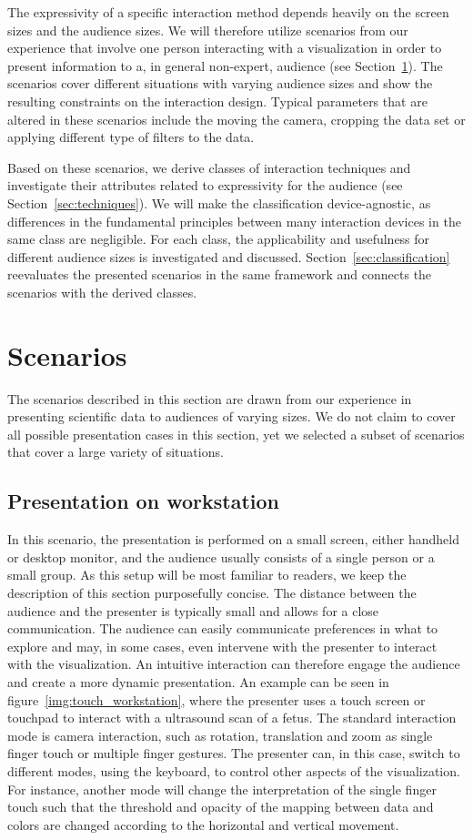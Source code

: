 \documentclass[review,journal]{vgtc}         %
\begin{document}
The expressivity of a specific interaction method depends heavily on the screen sizes and the audience sizes.
We will therefore utilize scenarios from our experience that involve one person interacting with a visualization in order to present information to a, in general non-expert, audience (see Section~\ref{sec:scenario}).
The scenarios cover different situations with varying audience sizes and show the resulting constraints on the interaction design.
Typical parameters that are altered in these scenarios include the moving the camera, cropping the data set or applying different type of filters to the data.

Based on these scenarios, we derive classes of interaction techniques and investigate their attributes related to expressivity for the audience (see Section~\ref{sec:techniques}).
We will make the classification device-agnostic, as differences in the fundamental principles between many interaction devices in the same class are negligible.
For each class, the applicability and usefulness for different audience sizes is investigated and discussed.
Section~\ref{sec:classification} reevaluates the presented scenarios in the same framework and connects the scenarios with the derived classes.

%
%
%
\section{Scenarios} \label{sec:scenario}
The scenarios described in this section are drawn from our experience in presenting scientific data to audiences of varying sizes.
We do not claim to cover all possible presentation cases in this section, yet we selected a subset of scenarios that cover a large variety of situations.

%
%
\subsection{Presentation on workstation}
In this scenario, the presentation is performed on a small screen, either handheld or desktop monitor, and the audience usually consists of a single person or a small group.
As this setup will be most familiar to readers, we keep the description of this section purposefully concise.
The distance between the audience and the presenter is typically small and allows for a close communication.
The audience can easily communicate preferences in what to explore and may, in some cases, even intervene with the presenter to interact with the visualization.
An intuitive interaction can therefore engage the audience and create a more dynamic presentation.
An example can be seen in figure~\ref{img:touch_workstation}, where the presenter uses a touch screen or touchpad to interact with a ultrasound scan of a fetus.
The standard interaction mode is camera interaction, such as rotation, translation and zoom as single finger touch or multiple finger gestures.
The presenter can, in this case, switch to different modes, using the keyboard, to control other aspects of the visualization.
For instance, another mode will change the interpretation of the single finger touch such that the threshold and opacity of the mapping between data and colors are changed according to the horizontal and vertical movement.
\end{document}
